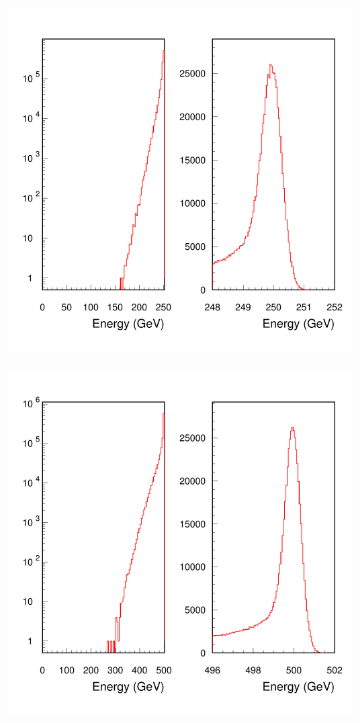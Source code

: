 \begin{figure}[htbp]
\begin{subfigure}{0.49\hsize} \includegraphics[width=\textwidth]{ILC/figs/ecmspect-250.pdf}
 \caption{ \label{fig:ilc:ecmspect-250}}
 \end{subfigure}
\begin{subfigure}{0.49\hsize} \includegraphics[width=\textwidth]{ILC/figs/ecmspect-500.pdf}

\end{subfigure}
\end{figure}
